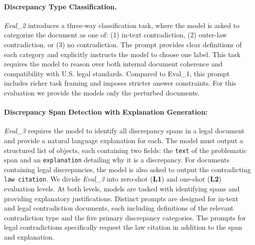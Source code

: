 \documentclass[11pt]{article}
\begin{document}
\paragraph{Discrepancy Type Classification.}

\textit{Eval\_2} introduces a three-way classification task, where the model is asked to categorize the document as one of: (1) in-text contradiction, (2) outer-law contradiction, or (3) no contradiction. The prompt provides clear definitions of each category and explicitly instructs the model to choose one label. This task requires the model to reason over both internal document coherence and compatibility with U.S. legal standards. Compared to Eval\_1, this prompt includes richer task framing and imposes stricter answer constraints. For this evaluation we provide the models only the perturbed documents.

\paragraph{Discrepancy Span Detection with Explanation Generation:}

\textit{Eval\_3} requires the model to identify all discrepancy spans in a legal document and provide a natural language explanation for each. The model must output a structured list of objects, each containing two fields: the \texttt{text} of the problematic span and an \texttt{explanation} detailing why it is a discrepancy. For documents containing legal discrepancies, the model is also asked to output the contradicting \texttt{law citation}.
We divide \textit{Eval\_3} into zero-shot (\textbf{L1}) and one-shot (\textbf{L2}) evaluation levels. At both levels, models are tasked with identifying spans and providing explanatory justifications. Distinct prompts are designed for in-text and legal contradiction documents, each including definitions of the relevant contradiction type and the five primary discrepancy categories. The prompts for legal contradictions specifically request the law citation in addition to the span and explanation.

\end{document}
